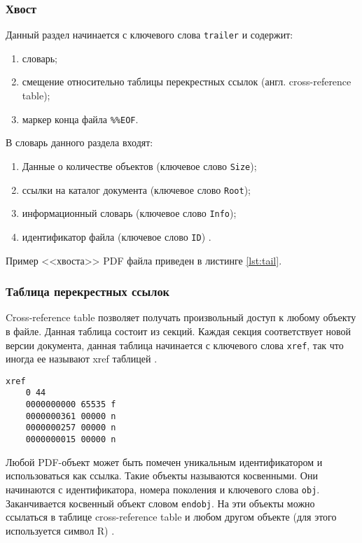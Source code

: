 \subsubsection{Хвост}
Данный раздел начинается с ключевого слова \texttt{trailer} и содержит:
\begin{enumerate}
	\item словарь;
	\item смещение относительно таблицы  перекрестных ссылок (англ. cross-reference table);
	\item маркер конца файла \texttt{\%\%EOF}.
\end{enumerate}
В словарь данного раздела входят:
\begin{enumerate}
	\item Данные о количестве объектов (ключевое слово \texttt{Size});
	\item ссылки на каталог документа (ключевое слово \texttt{Root});
	\item информационный словарь (ключевое слово \texttt{Info});
	\item идентификатор файла (ключевое слово \texttt{ID}) \cite{pdf_object_def}.
\end{enumerate}
Пример <<хвоста>> PDF файла приведен в листинге \ref{lst:tail}.






\subsubsection{Таблица  перекрестных ссылок}
Cross-reference table позволяет получать произвольный доступ к любому объекту в файле. Данная таблица состоит из секций. Каждая секция соответствует  новой версии документа, данная таблица начинается с ключевого слова \texttt{xref}, так что иногда ее называют xref таблицей \cite{pdf_structure_trans}.

\begin{lstlisting}[label=lst:xref,caption=Пример таблицы перекрестных ссылок]
	xref
	0 44
	0000000000 65535 f 
	0000000361 00000 n 
	0000000257 00000 n 
	0000000015 00000 n 
\end{lstlisting}






Любой PDF-объект может быть помечен уникальным идентификатором и использоваться как ссылка. Такие объекты называются косвенными. Они начинаются с идентификатора, номера поколения и ключевого слова \texttt{obj}. Заканчивается косвенный объект словом \texttt{endobj}. На эти объекты можно ссылаться в таблице 
cross-reference table и любом другом объекте (для этого используется символ R) \cite{pdf_structure_trans}. 


